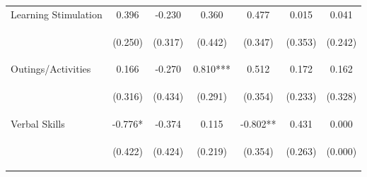 \begin{tabular}{lcccccc}
\noalign{\smallskip}Learning Stimulation & 0.396 & -0.230 & 0.360 & 0.477 & 0.015 & 0.041\\
 & \begin{footnotesize}(0.250)\end{footnotesize} & \begin{footnotesize}(0.317)\end{footnotesize} & \begin{footnotesize}(0.442)\end{footnotesize} & \begin{footnotesize}(0.347)\end{footnotesize} & \begin{footnotesize}(0.353)\end{footnotesize} & \begin{footnotesize}(0.242)\end{footnotesize}\\
\noalign{\smallskip}Outings/Activities & 0.166 & -0.270 & 0.810*** & 0.512 & 0.172 & 0.162\\
 & \begin{footnotesize}(0.316)\end{footnotesize} & \begin{footnotesize}(0.434)\end{footnotesize} & \begin{footnotesize}(0.291)\end{footnotesize} & \begin{footnotesize}(0.354)\end{footnotesize} & \begin{footnotesize}(0.233)\end{footnotesize} & \begin{footnotesize}(0.328)\end{footnotesize}\\
\noalign{\smallskip}Verbal Skills & -0.776* & -0.374 & 0.115 & -0.802** & 0.431 & 0.000\\
 & \begin{footnotesize}(0.422)\end{footnotesize} & \begin{footnotesize}(0.424)\end{footnotesize} & \begin{footnotesize}(0.219)\end{footnotesize} & \begin{footnotesize}(0.354)\end{footnotesize} & \begin{footnotesize}(0.263)\end{footnotesize} & \begin{footnotesize}(0.000)\end{footnotesize}\\

\end{tabular}
